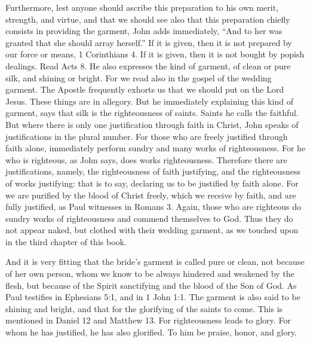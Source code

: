 Furthermore, lest anyone should ascribe this preparation to his own merit, strength, and virtue, and that we should see also that this preparation chiefly consists in providing the garment, John adds immediately, “And to her was granted that she should array herself.” If it is given, then it is not prepared by our force or means, 1 Corinthians 4. If it is given, then it is not bought by popish dealings. Read Acts 8. He also expresses the kind of garment, of clean or pure silk, and shining or bright. For we read also in the gospel of the wedding garment. The Apostle frequently exhorts us that we should put on the Lord Jesus. These things are in allegory. But he immediately explaining this kind of garment, says that silk is the righteousness of saints. Saints he calls the faithful. But where there is only one justification through faith in Christ, John speaks of justifications in the plural number. For those who are freely justified through faith alone, immediately perform sundry and many works of righteousness. For he who is righteous, as John says, does works righteousness. Therefore there are justifications, namely, the righteousness of faith justifying, and the righteousness of works justifying: that is to say, declaring us to be justified by faith alone. For we are purified by the blood of Christ freely, which we receive by faith, and are fully justified, as Paul witnesses in Romans 3. Again, those who are righteous do sundry works of righteousness and commend themselves to God. Thus they do not appear naked, but clothed with their wedding garment, as we touched upon in the third chapter of this book.

And it is very fitting that the bride’s garment is called pure or clean, not because of her own person, whom we know to be always hindered and weakened by the flesh, but because of the Spirit sanctifying and the blood of the Son of God. As Paul testifies in Ephesians 5:1, and in 1 John 1:1. The garment is also said to be shining and bright, and that for the glorifying of the saints to come. This is mentioned in Daniel 12 and Matthew 13. For righteousness leads to glory. For whom he has justified, he has also glorified. To him be praise, honor, and glory.
